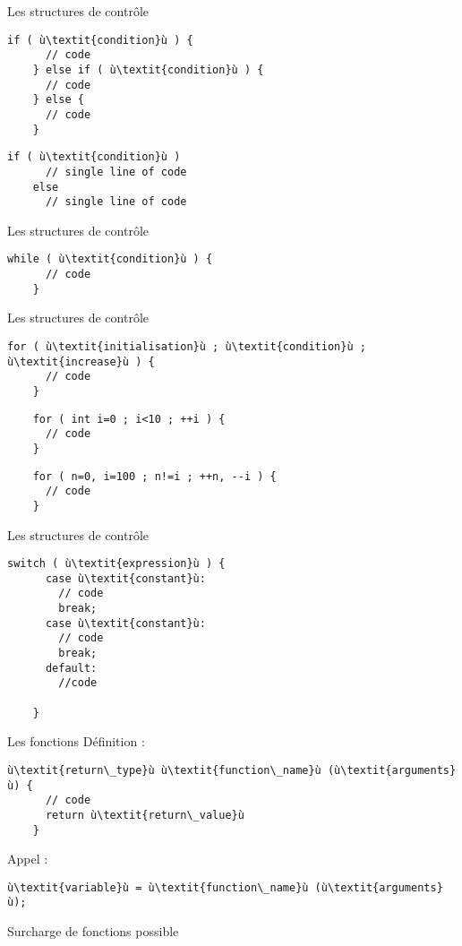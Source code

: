 \begin{frame}[fragile]{Les structures de contrôle}
  \begin{lstlisting}[escapechar=ù]
    if ( ù\textit{condition}ù ) {
      // code
    } else if ( ù\textit{condition}ù ) {
      // code
    } else {
      // code
    }
  \end{lstlisting}

  \begin{lstlisting}[escapechar=ù]
    if ( ù\textit{condition}ù )
      // single line of code
    else
      // single line of code
  \end{lstlisting}
\end{frame}

\begin{frame}[fragile]{Les structures de contrôle}
  \begin{lstlisting}[escapechar=ù]
    while ( ù\textit{condition}ù ) {
      // code
    }
  \end{lstlisting}
\end{frame}

\begin{frame}[fragile]{Les structures de contrôle}
  \begin{lstlisting}[escapechar=ù]
    for ( ù\textit{initialisation}ù ; ù\textit{condition}ù ; ù\textit{increase}ù ) {
      // code
    }
  \end{lstlisting}

  \begin{lstlisting}
    for ( int i=0 ; i<10 ; ++i ) {
      // code
    }
  \end{lstlisting}
  \begin{lstlisting}
    for ( n=0, i=100 ; n!=i ; ++n, --i ) {
      // code
    }
  \end{lstlisting}
\end{frame}

\begin{frame}[fragile]{Les structures de contrôle}
  \begin{lstlisting}[escapechar=ù]
    switch ( ù\textit{expression}ù ) {
      case ù\textit{constant}ù:
        // code
        break;
      case ù\textit{constant}ù:
        // code
        break;
      default:
        //code
        
    }
  \end{lstlisting}
\end{frame}

\begin{frame}[fragile]{Les fonctions}
  Définition :
  \begin{lstlisting}[escapechar=ù]
    ù\textit{return\_type}ù ù\textit{function\_name}ù (ù\textit{arguments}ù) {
      // code
      return ù\textit{return\_value}ù
    }
  \end{lstlisting}

  Appel :
  \begin{lstlisting}[escapechar=ù]
    ù\textit{variable}ù = ù\textit{function\_name}ù (ù\textit{arguments}ù);
  \end{lstlisting}

  Surcharge de fonctions possible
\end{frame}

